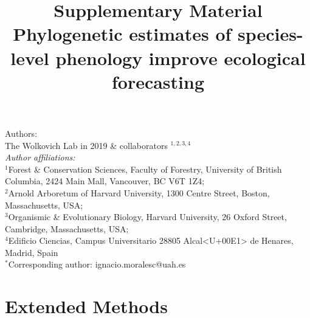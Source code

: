 \documentclass[11pt]{article}
\def\labelitemi{--}
\begin{document}



\title{Supplementary Material\\
Phylogenetic estimates of species-level phenology improve ecological forecasting}
\maketitle

\noindent Authors:\\
The Wolkovich Lab in 2019 \& collaborators $^{1,2,3,4}$ %
\vspace{2ex}\\
\emph{Author affiliations:}\\
$^{1}$Forest \& Conservation Sciences, Faculty of Forestry, University of British Columbia, 2424 Main Mall, Vancouver, BC V6T 1Z4;\\
$^{2}$Arnold Arboretum of Harvard University, 1300 Centre Street, Boston, Massachusetts, USA;\\
$^{3}$Organismic \& Evolutionary Biology, Harvard University, 26 Oxford Street, Cambridge, Massachusetts, USA;\\
$^{4}$Edificio Ciencias, Campus Universitario 28805 Alcal<U+00E1> de Henares, Madrid, Spain\\
 

\vspace{2ex}
$^*$Corresponding author: ignacio.moralesc@uah.es\\
\renewcommand{\thetable}{S\arabic{table}}
\renewcommand{\thefigure}{S\arabic{figure}}
\renewcommand{\labelitemi}{$-$}

\clearpage




\section*{Extended Methods}

\end{document}

